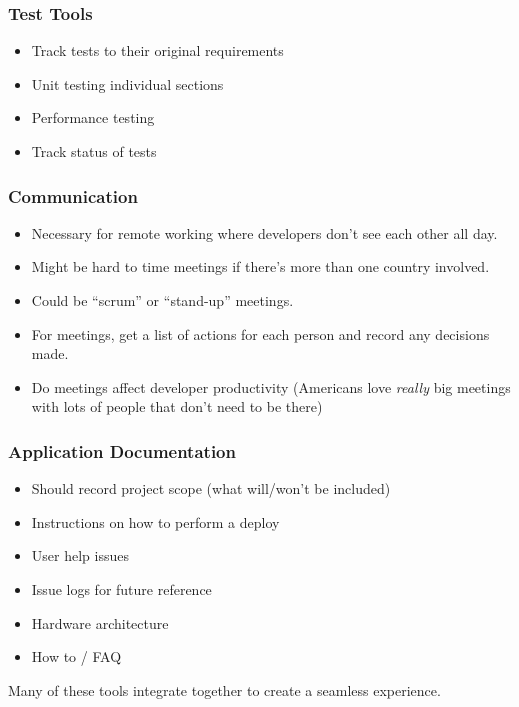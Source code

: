 \subsubsection{Test Tools}\label{ssub:test_tools}

\begin{itemize}
    \item Track tests to their original requirements
    \item Unit testing individual sections
    \item Performance testing
    \item Track status of tests
\end{itemize}

\subsubsection{Communication}\label{ssub:communication}

\begin{itemize}
    \item Necessary for remote working where developers don't see each other all day.
    \item Might be hard to time meetings if there's more than one country involved.
    \item Could be ``scrum'' or ``stand-up'' meetings.
    \item For meetings, get a list of actions for each person and record any decisions made.
    \item Do meetings affect developer productivity (Americans love \emph{really} big meetings with lots of people that don't need to be there)
\end{itemize}

\subsubsection{Application Documentation}\label{ssub:application_documentation}

\begin{itemize}
    \item Should record project scope (what will/won't be included)
    \item Instructions on how to perform a deploy
    \item User help issues
    \item Issue logs for future reference
    \item Hardware architecture
    \item How to / FAQ
\end{itemize}

\begin{note}
    Many of these tools integrate together to create a seamless experience.
\end{note}


